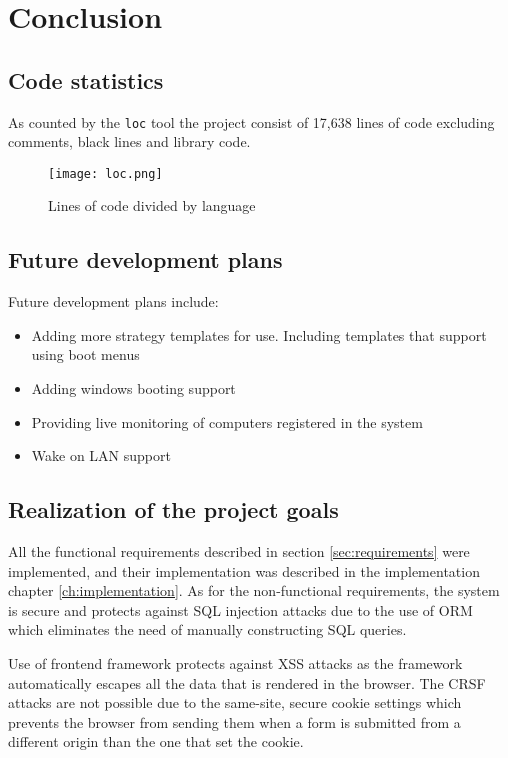 \documentclass[./main.tex]{subfiles}
\begin{document}
\chapter{Conclusion}

\section{Code statistics}

As counted by the \texttt{loc} \cite{loc} tool the project consist of 17,638 lines of code excluding comments, black lines and library code.

\begin{figure}[H]
  \centering
  \texttt{[image: loc.png]}
  \caption{Lines of code divided by language}
\end{figure}

\section{Future development plans}

Future development plans include:
\begin{itemize}
  \item Adding more strategy templates for use. Including templates that support using boot menus
  \item Adding windows booting support
  \item Providing live monitoring of computers registered in the system
  \item Wake on LAN support
\end{itemize}

\section{Realization of the project goals}

All the functional requirements described in section \ref{sec:requirements} were implemented, and their implementation was described in the implementation chapter \ref{ch:implementation}.
As for the non-functional requirements, the system is secure and protects against SQL injection attacks due to the use of ORM which eliminates the need of manually constructing SQL queries.

Use of frontend framework protects against XSS attacks as the framework automatically escapes all the data that is rendered in the browser.
The CRSF attacks are not possible due to the same-site, secure cookie settings which prevents the browser from sending them
when a form is submitted from a different origin than the one that set the cookie.
\end{document}
